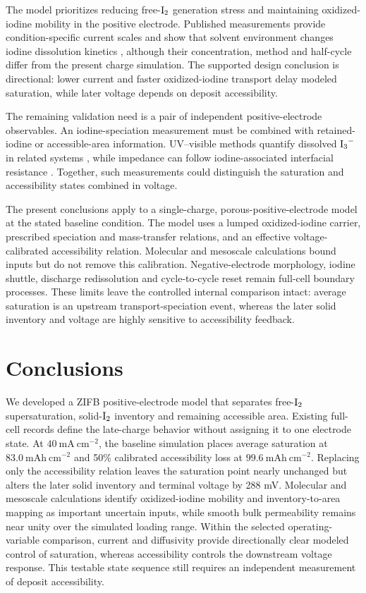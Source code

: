 \documentclass[11pt]{article}
\begin{document}
The model prioritizes reducing free-$\ce{I2}$ generation stress and maintaining oxidized-iodine mobility in the positive electrode. Published measurements provide condition-specific current scales and show that solvent environment changes iodine dissolution kinetics \citep{Zhao2022}, although their concentration, method and half-cycle differ from the present charge simulation. The supported design conclusion is directional: lower current and faster oxidized-iodine transport delay modeled saturation, while later voltage depends on deposit accessibility.

The remaining validation need is a pair of independent positive-electrode observables. An iodine-speciation measurement must be combined with retained-iodine or accessible-area information. UV--visible methods quantify dissolved $\ce{I3^-}$ in related systems \citep{ZnNC_AEL2025,WangNatCommun2025PSI}, while impedance can follow iodine-associated interfacial resistance \citep{Jang2021}. Together, such measurements could distinguish the saturation and accessibility states combined in voltage.

The present conclusions apply to a single-charge, porous-positive-electrode model at the stated baseline condition. The model uses a lumped oxidized-iodine carrier, prescribed speciation and mass-transfer relations, and an effective voltage-calibrated accessibility relation. Molecular and mesoscale calculations bound inputs but do not remove this calibration. Negative-electrode morphology, iodine shuttle, discharge redissolution and cycle-to-cycle reset remain full-cell boundary processes. These limits leave the controlled internal comparison intact: average saturation is an upstream transport-speciation event, whereas the later solid inventory and voltage are highly sensitive to accessibility feedback.

\section{Conclusions}


We developed a ZIFB positive-electrode model that separates free-$\ce{I2}$ supersaturation, solid-$\ce{I2}$ inventory and remaining accessible area. Existing full-cell records define the late-charge behavior without assigning it to one electrode state. At $40~\mathrm{mA~cm^{-2}}$, the baseline simulation places average saturation at $83.0~\mathrm{mAh~cm^{-2}}$ and 50\% calibrated accessibility loss at $99.6~\mathrm{mAh~cm^{-2}}$. Replacing only the accessibility relation leaves the saturation point nearly unchanged but alters the later solid inventory and terminal voltage by 288 mV. Molecular and mesoscale calculations identify oxidized-iodine mobility and inventory-to-area mapping as important uncertain inputs, while smooth bulk permeability remains near unity over the simulated loading range. Within the selected operating-variable comparison, current and diffusivity provide directionally clear modeled control of saturation, whereas accessibility controls the downstream voltage response. This testable state sequence still requires an independent measurement of deposit accessibility.
\end{document}

